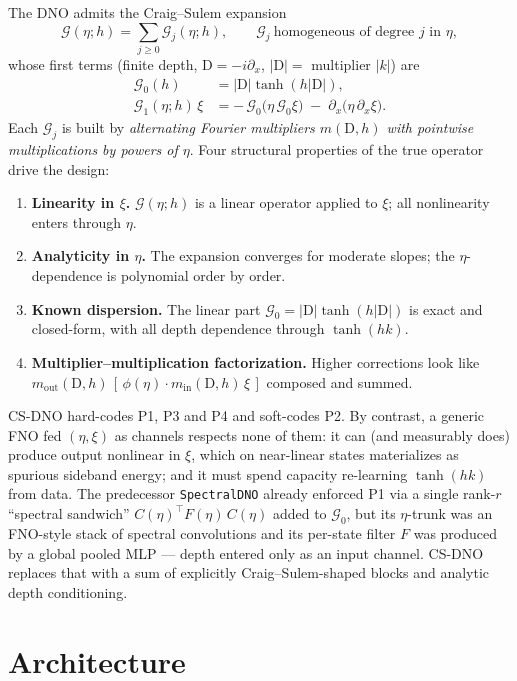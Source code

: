 \documentclass[11pt,letterpaper]{article}
\newcommand{\Gop}{\mathcal{G}}
\newcommand{\D}{\mathrm{D}}
\begin{document}
The DNO admits the Craig--Sulem expansion
\[
\Gop(\eta;h) = \sum_{j\ge 0} \Gop_j(\eta;h),
\qquad \Gop_j \ \text{homogeneous of degree } j \text{ in } \eta,
\]
whose first terms (finite depth, $\D = -i\partial_x$, $|\D| = $ multiplier $|k|$) are
\begin{align}
\Gop_0(h) &= |\D|\tanh(h|\D|), \\
\Gop_1(\eta;h)\,\xi &= -\,\Gop_0\bigl(\eta\, \Gop_0 \xi\bigr)\;-\;\partial_x\bigl(\eta\,\partial_x \xi\bigr).
\end{align}
Each $\Gop_j$ is built by \emph{alternating Fourier multipliers
$m(\D,h)$ with pointwise multiplications by powers of $\eta$}. Four structural
properties of the true operator drive the design:
\begin{enumerate}[leftmargin=1.6em, itemsep=2pt]
\item[\textbf{P1}] \textbf{Linearity in $\xi$.} $\Gop(\eta;h)$ is a linear
      operator applied to $\xi$; all nonlinearity enters through $\eta$.
\item[\textbf{P2}] \textbf{Analyticity in $\eta$.} The expansion converges for
      moderate slopes; the $\eta$-dependence is polynomial order by order.
\item[\textbf{P3}] \textbf{Known dispersion.} The linear part
      $\Gop_0 = |\D|\tanh(h|\D|)$ is exact and closed-form, with all depth
      dependence through $\tanh(hk)$.
\item[\textbf{P4}] \textbf{Multiplier--multiplication factorization.} Higher
      corrections look like $m_{\mathrm{out}}(\D,h)\,[\,\phi(\eta)\cdot
      m_{\mathrm{in}}(\D,h)\,\xi\,]$ composed and summed.
\end{enumerate}
CS-DNO hard-codes P1, P3 and P4 and soft-codes P2. By contrast, a generic FNO
fed $(\eta,\xi)$ as channels respects none of them: it can (and measurably does)
produce output nonlinear in $\xi$, which on near-linear states materializes as
spurious sideband energy; and it must spend capacity re-learning
$\tanh(hk)$ from data. The predecessor \texttt{SpectralDNO} already enforced P1
via a single rank-$r$ ``spectral sandwich'' $C(\eta)^{\!\top} F(\eta)\, C(\eta)$
added to $\Gop_0$, but its $\eta$-trunk was an FNO-style stack of spectral
convolutions and its per-state filter $F$ was produced by a global pooled MLP
--- depth entered only as an input channel. CS-DNO replaces that with a sum of
explicitly Craig--Sulem-shaped blocks and analytic depth conditioning.

\section{Architecture}
\end{document}
